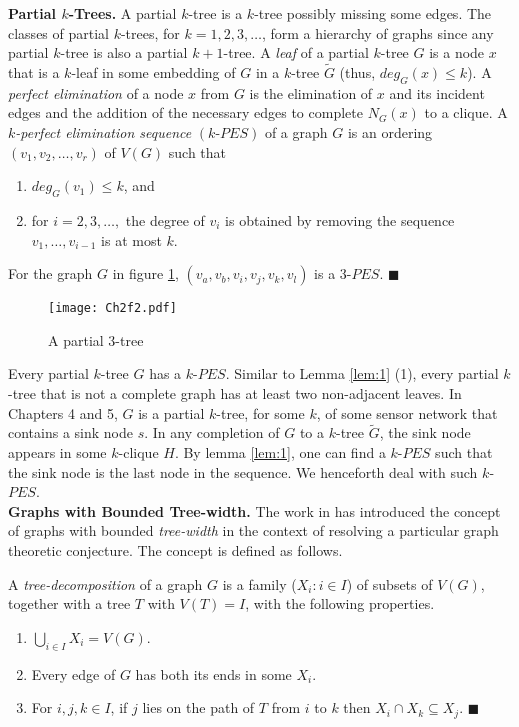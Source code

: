 {\bf Partial $k$-Trees.} A partial $k$-tree is a $k$-tree possibly missing some edges. The classes of partial $k$-trees, for $k=1,2,3,\ldots$, form a hierarchy of graphs since any partial $k$-tree is also a partial $k+1$-tree. A \textit{leaf} of a partial $k$-tree $G$ is a node $x$ that is a $k$-leaf in some embedding of $G$ in a $k$-tree $\tilde{G}$ (thus, $deg_G(x)\leq k$). A \textit{perfect elimination} of a node $x$ from $G$ is the elimination of $x$ and its incident edges and the addition of the necessary edges to complete $N_G(x)$ to a clique. A \textit{$k$-perfect elimination sequence} $(k\mbox{-}PES)$ of a graph $G$ is an ordering $(v_1,v_2,\ldots,v_r)$ of $V(G)$ such that

\begin{enumerate}[noitemsep]
\item $deg_G(v_1)\leq k$, and
\item for $i=2,3,\ldots,$ the degree of $v_i$ is obtained by removing the sequence $v_1,\ldots,v_{i-1}$ is at most $k$.
\end{enumerate}

\begin{example}
\normalfont 
For the graph $G$ in figure \ref{fig:f3t2}, $(v_a,v_b,v_i,v_j,v_k,v_l)$ is a 3-$PES$. $\blacksquare$
\end{example}
\begin{figure}[!htb]
\centering
\texttt{[image: Ch2f2.pdf]}
 \caption{ A partial 3-tree}
 \label{fig:f3t2}

\end{figure}
Every partial $k$-tree $G$ has a $k\mbox{-}PES$. Similar to Lemma \ref{lem:1} (1), every partial $k$-tree that is not a complete graph has at least two non-adjacent leaves. In Chapters 4 and 5, $G$ is a partial $k$-tree, for some $k$, of some sensor network that contains a sink node $s$. In any completion of $G$ to a $k$-tree $\tilde{G}$, the sink node appears in some $k$-clique $H$. By lemma \ref{lem:1}, one can find a $k$-$PES$ such that the sink node is the last node in the sequence. We henceforth deal with such $k$-$PES$.\\

{\bf Graphs with Bounded Tree-width.}
The work in \cite{robertson1986graph} has introduced the concept of graphs with bounded \textit{tree-width} in the context of resolving a particular graph theoretic conjecture. The concept is defined as follows.
\begin{definition}\normalfont \cite{robertson1986graph}
A \textit{tree-decomposition} of a graph $G$ is a family ($X_i:i\in I$) of subsets of $V(G)$, together with a tree $T$ with $V(T)=I$, with the following properties.
\begin{enumerate}[noitemsep]
\item $\displaystyle \bigcup_{i\in I} X_i =V(G)$.
\item Every edge of $G$ has both its ends in some $X_i$.
\item For $i,j,k \in I$, if $j$ lies on the path of $T$ from $i$ to $k$ then $X_i\cap X_k \subseteq X_j$. $\blacksquare$
\end{enumerate} 
\end{definition}

